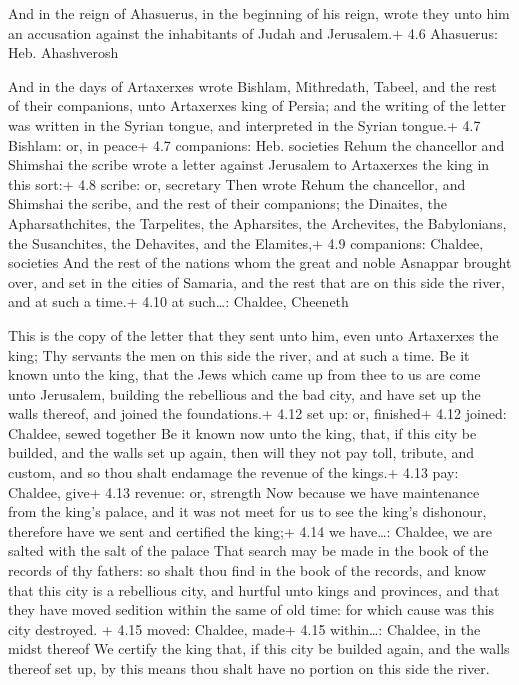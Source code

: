  And in the reign of Ahasuerus, in the beginning of his
reign, wrote they unto him an accusation against the inhabitants of
Judah and Jerusalem.+ 4.6 Ahasuerus: Heb. Ahashverosh

 And in the days of Artaxerxes wrote Bishlam, Mithredath,
Tabeel, and the rest of their companions, unto Artaxerxes king of
Persia; and the writing of the letter was written in the Syrian tongue,
and interpreted in the Syrian tongue.+ 4.7 Bishlam: or, in peace+ 4.7
companions: Heb. societies  Rehum the chancellor and
Shimshai the scribe wrote a letter against Jerusalem to Artaxerxes the
king in this sort:+ 4.8 scribe: or, secretary  Then wrote
Rehum the chancellor, and Shimshai the scribe, and the rest of their
companions; the Dinaites, the Apharsathchites, the Tarpelites, the
Apharsites, the Archevites, the Babylonians, the Susanchites, the
Dehavites, and the Elamites,+ 4.9 companions: Chaldee, societies
 And the rest of the nations whom the great and noble
Asnappar brought over, and set in the cities of Samaria, and the rest
that are on this side the river, and at such a time.+ 4.10 at
such\ldots: Chaldee, Cheeneth

 This is the copy of the letter that they sent unto him,
even unto Artaxerxes the king; Thy servants the men on this side the
river, and at such a time.  Be it known unto the king, that
the Jews which came up from thee to us are come unto Jerusalem, building
the rebellious and the bad city, and have set up the walls thereof, and
joined the foundations.+ 4.12 set up: or, finished+ 4.12 joined:
Chaldee, sewed together  Be it known now unto the king,
that, if this city be builded, and the walls set up again, then will
they not pay toll, tribute, and custom, and so thou shalt endamage the
revenue of the kings.+ 4.13 pay: Chaldee, give+ 4.13 revenue: or,
strength  Now because we have maintenance from the king's
palace, and it was not meet for us to see the king's dishonour,
therefore have we sent and certified the king;+ 4.14 we have\ldots:
Chaldee, we are salted with the salt of the palace  That
search may be made in the book of the records of thy fathers: so shalt
thou find in the book of the records, and know that this city is a
rebellious city, and hurtful unto kings and provinces, and that they
have moved sedition within the same of old time: for which cause was
this city destroyed. + 4.15 moved: Chaldee, made+ 4.15 within\ldots:
Chaldee, in the midst thereof  We certify the king that, if
this city be builded again, and the walls thereof set up, by this means
thou shalt have no portion on this side the river.

